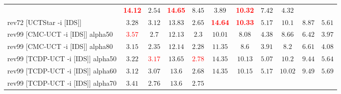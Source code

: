 \documentclass{article}
\begin{document}
\begin{tabular}{|l|r@{$\pm$}rr@{$\pm$}rr@{$\pm$}rr@{$\pm$}rr@{$\pm$}rr@{$\pm$}rr@{$\pm$}rr@{$\pm$}rr@{$\pm$}rr@{$\pm$}r|}
& \multicolumn{2}{c}{\textbf{\textcolor{red}{14.12}}}
& \multicolumn{2}{c}{$2.54$}
& \multicolumn{2}{c}{\textbf{\textcolor{red}{14.65}}}
& \multicolumn{2}{c}{$8.45$}
& \multicolumn{2}{c}{$3.89$}
& \multicolumn{2}{c}{\textbf{\textcolor{red}{10.32}}}
& \multicolumn{2}{c}{$7.42$}
& \multicolumn{2}{c|}{$4.32$}
\\
rev72 [UCTStar -i [IDS]]
& \multicolumn{2}{c}{$3.28$}
& \multicolumn{2}{c}{$3.12$}
& \multicolumn{2}{c}{$13.83$}
& \multicolumn{2}{c}{$2.65$}
& \multicolumn{2}{c}{\textbf{\textcolor{red}{14.64}}}
& \multicolumn{2}{c}{\textbf{\textcolor{red}{10.33}}}
& \multicolumn{2}{c}{$5.17$}
& \multicolumn{2}{c}{$10.1$}
& \multicolumn{2}{c}{$8.87$}
& \multicolumn{2}{c|}{$5.61$}
\\
\hline
rev99 [CMC-UCT -i [IDS]] alpha50
& \multicolumn{2}{c}{\textbf{\textcolor{red}{$3.57$}}}
& \multicolumn{2}{c}{$2.7$}
& \multicolumn{2}{c}{$12.13$}
& \multicolumn{2}{c}{$2.3$}
& \multicolumn{2}{c}{$10.01$}
& \multicolumn{2}{c}{$8.08$}
& \multicolumn{2}{c}{$4.38$}
& \multicolumn{2}{c}{$8.66$}
& \multicolumn{2}{c}{$6.42$}
& \multicolumn{2}{c|}{$3.97$}
\\
rev99 [CMC-UCT -i [IDS]] alpha80
& \multicolumn{2}{c}{$3.15$}
& \multicolumn{2}{c}{$2.35$}
& \multicolumn{2}{c}{$12.14$}
& \multicolumn{2}{c}{$2.28$}
& \multicolumn{2}{c}{$11.35$}
& \multicolumn{2}{c}{$8.6$}
& \multicolumn{2}{c}{$3.91$}
& \multicolumn{2}{c}{$8.2$}
& \multicolumn{2}{c}{$6.61$}
& \multicolumn{2}{c|}{$4.08$}
\\
rev99 [TCDP-UCT -i [IDS]] alpha50
& \multicolumn{2}{c}{$3.22$}
& \multicolumn{2}{c}{\textbf{\textcolor{red}{$3.17$}}}
& \multicolumn{2}{c}{\textbf{$13.65$}}
& \multicolumn{2}{c}{\textbf{\textcolor{red}{$2.78$}}}
& \multicolumn{2}{c}{\textbf{$14.35$}}
& \multicolumn{2}{c}{\textbf{$10.13$}}
& \multicolumn{2}{c}{\textbf{$5.07$}}
& \multicolumn{2}{c}{\textbf{$10.2$}}
& \multicolumn{2}{c}{\textbf{$9.44$}}
& \multicolumn{2}{c|}{$5.64$}
\\
rev99 [TCDP-UCT -i [IDS]] alpha60
& \multicolumn{2}{c}{$3.12$}
& \multicolumn{2}{c}{\textbf{$3.07$}}
& \multicolumn{2}{c}{\textbf{$13.6$}}
& \multicolumn{2}{c}{\textbf{$2.68$}}
& \multicolumn{2}{c}{\textbf{$14.35$}}
& \multicolumn{2}{c}{\textbf{$10.15$}}
& \multicolumn{2}{c}{\textbf{$5.17$}}
& \multicolumn{2}{c}{\textbf{$10.02$}}
& \multicolumn{2}{c}{\textbf{$9.49$}}
& \multicolumn{2}{c|}{$5.69$}
\\
rev99 [TCDP-UCT -i [IDS]] alpha70
& \multicolumn{2}{c}{\textbf{$3.41$}}
& \multicolumn{2}{c}{$2.76$}
& \multicolumn{2}{c}{\textbf{$13.6$}}
& \multicolumn{2}{c}{\textbf{$2.75$}}

\end{tabular}
\end{document}
